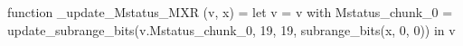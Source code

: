 function _update_Mstatus_MXR (v, x) = let v = { v with Mstatus_chunk_0 = update_subrange_bits(v.Mstatus_chunk_0, 19, 19, subrange_bits(x, 0, 0)) } in
  v
